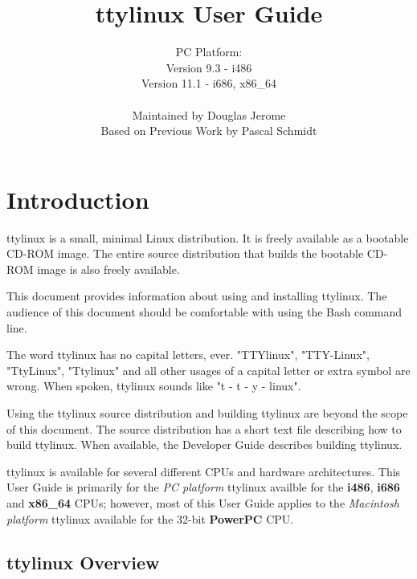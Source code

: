 \documentclass[10pt]{article}
\title{ttylinux User Guide}
\author{PC Platform:\\Version 9.3 - i486\\Version 11.1 - i686, x86\_64\\ \\Maintained by Douglas Jerome\\Based on Previous Work by Pascal Schmidt}
\begin{document}
\maketitle
\thispagestyle{empty}
\newpage


\tableofcontents


\newpage
{}
\parskip=10pt
\section{Introduction}

ttylinux is a small, minimal Linux distribution. It is freely available as a
bootable CD-ROM image. The entire source distribution that builds the bootable
CD-ROM image is also freely available.

This document provides information about using and installing ttylinux. The
audience of this document should be comfortable with using the Bash command
line.

The word ttylinux has no capital letters, ever. "TTYlinux", "TTY-Linux",
"TtyLinux", "Ttylinux" and all other usages of a capital letter or extra symbol
are wrong. When spoken, ttylinux sounds like "t - t - y - linux".

Using the ttylinux source distribution and building ttylinux are beyond the
scope of this document. The source distribution has a short text file
describing how to build ttylinux. When available, the Developer Guide describes
building ttylinux.

ttylinux is available for several different CPUs and hardware architectures.
This User Guide is primarily for the {\it PC platform} ttylinux availble for
the {\bf i486}, {\bf i686} and {\bf x86\_64} CPUs; however, most of this User
Guide applies to the {\it Macintosh platform} ttylinux available for the 32-bit
{\bf PowerPC} CPU.

\subsection{ttylinux Overview}
\end{document}
